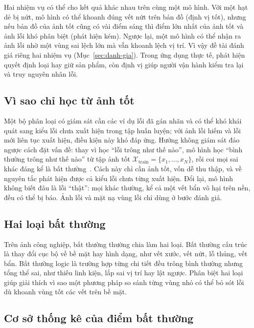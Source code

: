 Hai nhiệm vụ có thể cho kết quả khác nhau trên cùng một mô hình. Với một hạt dẻ bị nứt, mô hình có thể khoanh đúng
vết nứt trên bản đồ (định vị tốt), nhưng nếu bản đồ của ảnh tốt cũng có vài điểm sáng thì điểm lớn nhất của ảnh tốt
và ảnh lỗi khó phân biệt (phát hiện kém). Ngược lại, một mô hình có thể nhận ra ảnh lỗi nhờ một vùng sai lệch lớn
mà vẫn khoanh lệch vị trí. Vì vậy đề tài đánh giá riêng hai nhiệm vụ (Mục~\ref{sec:danh-gia}). Trong ứng dụng thực
tế, phát hiện quyết định loại hay giữ sản phẩm, còn định vị giúp người vận hành kiểm tra lại và truy nguyên nhân lỗi.

\subsection{Vì sao chỉ học từ ảnh tốt}

Một bộ phân loại có giám sát cần các ví dụ lỗi đã gán nhãn và có thể khó khái quát sang kiểu lỗi chưa xuất hiện
trong tập huấn luyện; với ảnh lỗi hiếm và lỗi mới liên tục xuất hiện, điều kiện này khó đáp ứng. Hướng không giám
sát đảo ngược cách đặt vấn đề: thay vì học ``lỗi trông như thế nào'', mô hình học ``bình thường trông như thế nào''
từ tập ảnh tốt $\mathcal{X}_{\text{train}} = \{x_1, \dots, x_N\}$, rồi coi mọi sai khác đáng kể là bất
thường~\cite{bergmannMVTecADComprehensive2019}. Cách này chỉ cần ảnh tốt, vốn dễ thu thập, và về nguyên tắc phát
hiện được cả kiểu lỗi chưa từng xuất hiện. Đổi lại, mô hình không biết đâu là lỗi ``thật'': mọi khác thường, kể cả
một vết bẩn vô hại trên nền, đều có thể bị báo. Ảnh lỗi và mặt nạ vùng lỗi chỉ dùng ở bước đánh giá.

\subsection{Hai loại bất thường}

Trên ảnh công nghiệp, bất thường thường chia làm hai loại. Bất thường cấu trúc là thay đổi cục bộ về bề mặt hay
hình dạng, như vết xước, vết nứt, lỗ thủng, vết bẩn. Bất thường logic là trường hợp từng chi tiết đều trông bình
thường nhưng tổng thể sai, như thiếu linh kiện, lắp sai vị trí hay lật ngược. Phân biệt hai loại giúp giải thích vì
sao một phương pháp so sánh từng vùng nhỏ có thể bỏ sót lỗi dù khoanh vùng tốt các vết trên bề mặt.

\subsection{Cơ sở thống kê của điểm bất thường}

